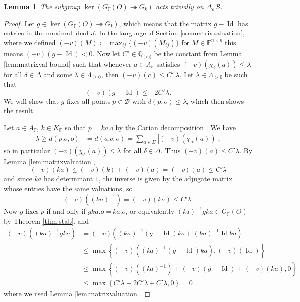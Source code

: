 \documentclass[12pt]{amsart}
\newcommand{\F}{\mathbb{F} }
\newcommand{\Q}{\mathbb{Q} }
\newcommand{\B}{\mathcal{B}}
\numberwithin{equation}{section}
\newtheorem{lemma}[theorem]{Lemma}
\theoremstyle{remark} %
\begin{document}
\begin{lemma}
	The subgroup $\operatorname{ker}( G_\F(O) \twoheadrightarrow G_k )$ acts trivially on $\Delta_o\B$.
\end{lemma}
\begin{proof}
	Let $g\in \ker( G_\F(O) \twoheadrightarrow G_k )$, which means that the matrix $g-\operatorname{Id}$ has entries in the maximal ideal $J$. In the language of Section \ref{sec:matrixvaluation}, where we defined $(-v)(M) \coloneqq \max_{ij}\{(-v)(M_{ij})\}$ for $M\in \F^{n\times n}$ this means $(-v)(g-\operatorname{Id}) < 0$.
	Now let $C' \in \Q_{\geq 0}$ be the constant from Lemma \ref{lem:matrixval-bound} such that whenever $a\in A_\F$ satisfies $(-v)(\chi_\delta(a)) \leq \lambda $ for all $\delta \in \Delta$ and some $\lambda \in \Lambda_{\geq 0}$, then $(-v)(a) \leq C'\ \lambda$. Let $\lambda \in \Lambda_{>0}$ be such that  %
	$$
	(-v)(g-\operatorname{Id}) \leq - 2 C' \lambda.
	$$ 
	We will show that $g$ fixes all points $p\in \B$ with $d(p,o) \leq \lambda$, which then shows the result.
	
	Let $a\in A_\F$, $k \in K_\F$ so that $p = ka.o$ by the Cartan decomposition \cite[Theorem \ref{I-thm:KAK}]{AppAGRCF}. We have
	\begin{align*}
		\lambda \geq  d(p.o,o) &= d(a.o,o) = \sum_{\alpha \in \Sigma} \left\lvert (-v)(\chi_\alpha(a))\right\rvert ,
	\end{align*} 
so in particular $(-v)(\chi_\delta(a)) \leq \lambda$ for all $\delta \in \Delta$. Thus $(-v)(a) \leq C' \lambda$. By Lemma \ref{lem:matrixvaluation}, 
$$
(-v)(ka) \leq (-v)(k) + (-v)(a) = (-v)(a) \leq C' \lambda
$$
and since $ka$ has determinant $1$, the inverse is given by the adjugate matrix whose entries have the same valuations, so
$$
(-v)\left((ka)^{-1}\right) = (-v)(ka)  \leq C'\lambda.
$$
Now $g$ fixes $p$ if and only if $gka.o = ka.o$, or equivalently $(ka)^{-1}gka \in G_\F(O)$ by Theorem \ref{thm:stab}, and 
\begin{align*}
	(-v)\left( (ka)^{-1}gka \right) &= (-v)\left( (ka)^{-1}(g - \operatorname{Id}) ka + (ka)^{-1}\operatorname{Id}ka   \right) \\
	&\leq \max \left\{ (-v)\left( (ka)^{-1}(g - \operatorname{Id}) ka   \right) , (-v)(\operatorname{Id})\right\} \\
	&\leq \max \left\{ (-v)\left((ka)^{-1}\right) + (-v)(g-\operatorname{Id})  + (-v)(ka) , 0 \right\} \\
	& \leq  \max \left\{ C'\lambda -2C'\lambda + C'\lambda , 0 \right\} = 0
\end{align*}
where we used Lemma \ref{lem:matrixvaluation}.
\end{proof}
\end{document}
